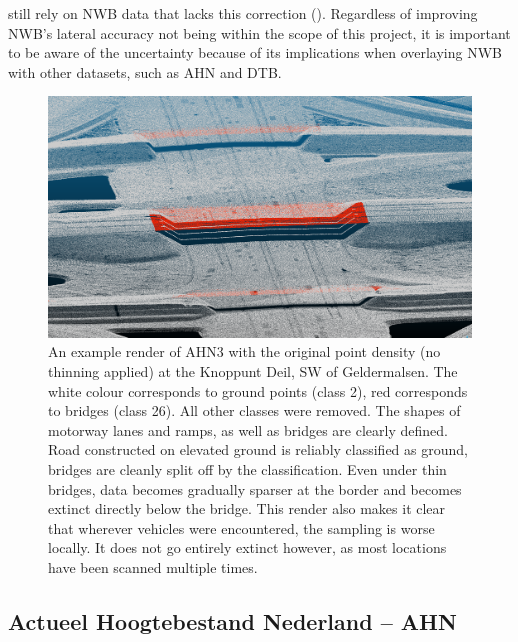 still rely on NWB data that lacks this correction (\cite{nwb_gecorrigeerd}). Regardless of improving NWB’s lateral accuracy not being within the scope of this project, it is important to be aware of the uncertainty because of its implications when overlaying NWB with other datasets, such as AHN and DTB.

\begin{figure}[ht]
    \centering
    \includegraphics[width=\linewidth]{p2/figs/ahn_sample_01.png} 
    \caption{An example render of AHN3 with the original point density (no thinning applied) at the Knoppunt Deil, SW of Geldermalsen. The white colour corresponds to ground points (class 2), red corresponds to bridges (class 26). All other classes were removed. The shapes of motorway lanes and ramps, as well as bridges are clearly defined. Road constructed on elevated ground is reliably classified as ground, bridges are cleanly split off by the classification. Even under thin bridges, data becomes gradually sparser at the border and becomes extinct directly below the bridge. This render also makes it clear that wherever vehicles were encountered, the sampling is worse locally. It does not go entirely extinct however, as most locations have been scanned multiple times.}
    \label{fig:ahnbridges}
\end{figure}

\subsection{Actueel Hoogtebestand Nederland – AHN}
\label{sub:ahn}

